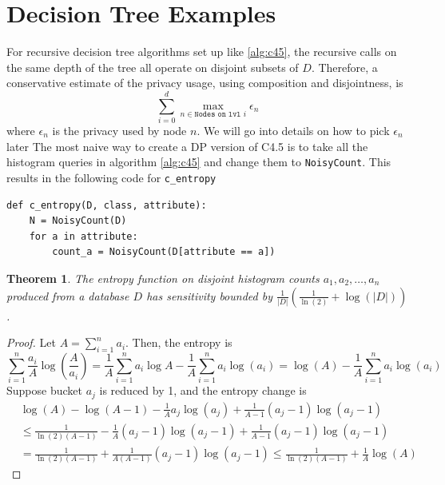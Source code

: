 \documentclass[11pt]{article}
\newtheorem{theorem}{Theorem}
\begin{document}
\section{Decision Tree Examples}
For recursive decision tree algorithms set up like \ref{alg:c45}, the recursive calls on the same depth of the tree all operate on disjoint subsets of $D$. Therefore, a conservative estimate of the privacy usage, using composition and disjointness, is
\begin{equation}
\sum_{i=0}^d \max_{n \in \texttt{Nodes on lvl }i} \epsilon_{n}
\end{equation}
where $\epsilon_n$ is the privacy used by node $n$. We will go into details on how to pick $\epsilon_n$ later
The most naive way to create a DP version of C4.5 is to take all the histogram queries in algorithm \ref{alg:c45} and change them to \texttt{NoisyCount}. This results in the following code for \texttt{c\_entropy}
\begin{lstlisting}
def c_entropy(D, class, attribute):
    N = NoisyCount(D)
    for a in attribute:
        count_a = NoisyCount(D[attribute == a])
\end{lstlisting}
\begin{theorem}
The entropy function on disjoint histogram counts $a_1,a_2,\ldots, a_n$ produced from a database $D$ has sensitivity bounded by $\frac{1}{|D|}\left(\frac{1}{\ln(2)} + \log(|D|) \right)$.
\end{theorem}
\begin{proof}
Let $A = \sum_{i=1}^n a_i$. Then, the entropy is 
\[
\sum_{i=1}^n \frac{a_i}{A}\log\left(\frac{A}{a_i}\right) = \frac{1}{A}\sum_{i=1}^n a_i\log A - \frac{1}{A} \sum_{i=1}^n a_i\log(a_i) = \log(A) - \frac{1}{A}\sum_{i=1}^n a_i\log(a_i)
\]
Suppose bucket $a_j$ is reduced by 1, and the entropy change is
\begin{align*}
&\log(A) - \log(A-1) - \frac{1}{A} a_j\log(a_j) + \frac{1}{A-1} (a_j-1)\log(a_j-1) \\
&\leq \frac{1}{\ln(2)(A-1)} -\frac{1}{A}(a_j-1)\log(a_j-1) + \frac{1}{A-1}(a_j-1)\log(a_j-1) \\
&= \frac{1}{\ln(2)(A-1)}+\frac{1}{A(A-1)}(a_j-1)\log(a_j-1) \leq \frac{1}{\ln(2)(A-1)} + \frac{1}{A}\log(A)
\end{align*}

\end{proof}



\end{document}
